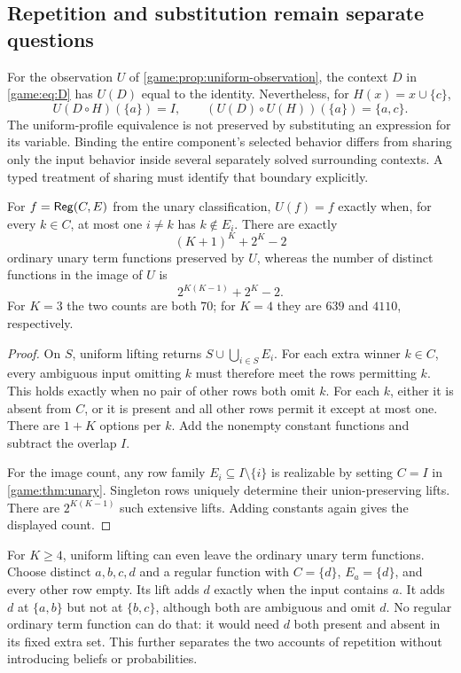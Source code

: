 \subsection{Repetition and substitution remain separate questions}

For the observation $U$ of \cref{game:prop:uniform-observation}, the
context $D$ in \eqref{game:eq:D} has $U(D)$ equal to the identity.
Nevertheless, for $H(x)=x\cup\{c\}$,
\[
 U(D\circ H)(\{a\})=I,\qquad
 (U(D)\circ U(H))(\{a\})=\{a,c\}.
\]
The uniform-profile equivalence is not preserved by substituting an
expression for its variable. Binding the entire component's selected
behavior differs from sharing only the input behavior inside several
separately solved surrounding contexts. A typed treatment of sharing
must identify that boundary explicitly.

\begin{proposition}
For $f=\mathsf{Reg}(C,E)$ from the unary classification, $U(f)=f$ exactly when, for
every $k\in C$, at most one $i\ne k$ has $k\notin E_i$. There are exactly
\[
 (K+1)^K+2^K-2
\]
ordinary unary term functions preserved by $U$, whereas the number of
distinct functions in the image of $U$ is
\[
 2^{K(K-1)}+2^K-2.
\]
For $K=3$ the two counts are both $70$; for $K=4$ they are $639$ and
$4110$, respectively.
\end{proposition}
\begin{proof}
On $S$, uniform lifting returns
$S\cup\bigcup_{i\in S}E_i$. For each extra winner $k\in C$, every
ambiguous input omitting $k$ must therefore meet the rows permitting
$k$. This holds exactly when no pair of other rows both omit $k$.
For each $k$, either it is absent from $C$, or it is present and all
other rows permit it except at most one. There are $1+K$ options per
$k$. Add the nonempty constant functions and subtract the overlap $I$.

For the image count, any row family $E_i\subseteq I\setminus\{i\}$ is
realizable by setting $C=I$ in \cref{game:thm:unary}. Singleton rows
uniquely determine their union-preserving lifts. There are
$2^{K(K-1)}$ such extensive lifts. Adding constants again gives the
displayed count.
\end{proof}

For $K\geq4$, uniform lifting can even leave the ordinary unary term
functions. Choose distinct $a,b,c,d$ and a regular function with
$C=\{d\}$, $E_a=\{d\}$, and every other row empty. Its lift adds $d$
exactly when the input contains $a$. It adds $d$ at $\{a,b\}$ but not
at $\{b,c\}$, although both are ambiguous and omit $d$. No regular
ordinary term function can do that: it would need $d$ both present and
absent in its fixed extra set. This further separates the two accounts
of repetition without introducing beliefs or probabilities.

